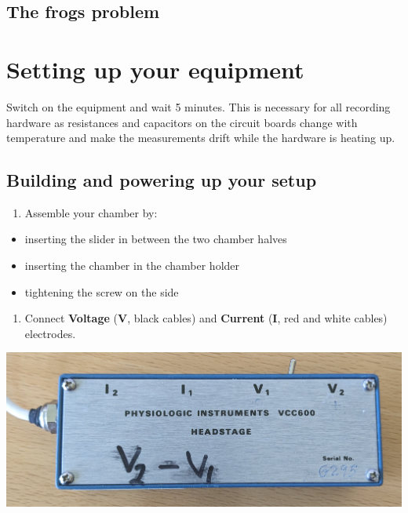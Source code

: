 \documentclass[
]{book}
\providecommand{\tightlist}{%
  \setlength{\itemsep}{0pt}\setlength{\parskip}{0pt}}
\begin{document}
\section{The frogs problem}\label{the-frogs-problem}

\chapter{Setting up your equipment}\label{setting-up-your-equipment}

Switch on the equipment and wait 5 minutes. This is necessary for all recording hardware as resistances and capacitors on the circuit boards change with temperature and make the measurements drift while the hardware is heating up.

\section{Building and powering up your setup}\label{building-and-powering-up-your-setup}

\begin{enumerate}
\def\labelenumi{\arabic{enumi}.}
\tightlist
\item
  Assemble your chamber by:
\end{enumerate}

\begin{itemize}
\item
  inserting the slider in between the two chamber halves
\item
  inserting the chamber in the chamber holder
\item
  tightening the screw on the side
\end{itemize}

\begin{enumerate}
\def\labelenumi{\arabic{enumi}.}
\setcounter{enumi}{1}
\tightlist
\item
  Connect \textbf{Voltage} (\textbf{V}, black cables) and \textbf{Current} (\textbf{I}, red and white cables) electrodes.
\end{enumerate}

\includegraphics[width=37.46in]{images/headstage}
\end{document}
